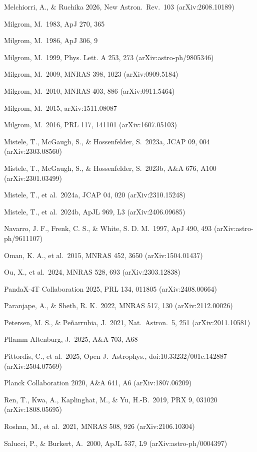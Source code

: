\documentclass[
  10pt,
]{article}
\begin{document}
{\begin{list}{}{\setlength{\leftmargin}{1.5em}\setlength{\itemindent}{-1.5em}\setlength{\itemsep}{1pt}\setlength{\parsep}{0pt}}
\item Melchiorri, A., \& Ruchika 2026, New Astron.\ Rev.\ 103 (arXiv:2608.10189)
\item Milgrom, M.\ 1983, ApJ 270, 365
\item Milgrom, M.\ 1986, ApJ 306, 9
\item Milgrom, M.\ 1999, Phys. Lett. A 253, 273 (arXiv:astro-ph/9805346)
\item Milgrom, M.\ 2009, MNRAS 398, 1023 (arXiv:0909.5184)
\item Milgrom, M.\ 2010, MNRAS 403, 886 (arXiv:0911.5464)
\item Milgrom, M.\ 2015, arXiv:1511.08087
\item Milgrom, M.\ 2016, PRL 117, 141101 (arXiv:1607.05103)
\item Mistele, T., McGaugh, S., \& Hossenfelder, S.\ 2023a, JCAP 09, 004 (arXiv:2303.08560)
\item Mistele, T., McGaugh, S., \& Hossenfelder, S.\ 2023b, A\&A 676, A100 (arXiv:2301.03499)
\item Mistele, T., et al.\ 2024a, JCAP 04, 020 (arXiv:2310.15248)
\item Mistele, T., et al.\ 2024b, ApJL 969, L3 (arXiv:2406.09685)
\item Navarro, J. F., Frenk, C. S., \& White, S. D. M.\ 1997, ApJ 490, 493 (arXiv:astro-ph/9611107)
\item Oman, K. A., et al.\ 2015, MNRAS 452, 3650 (arXiv:1504.01437)
\item Ou, X., et al.\ 2024, MNRAS 528, 693 (arXiv:2303.12838)
\item PandaX-4T Collaboration 2025, PRL 134, 011805 (arXiv:2408.00664)
\item Paranjape, A., \& Sheth, R. K.\ 2022, MNRAS 517, 130 (arXiv:2112.00026)
\item Petersen, M. S., \& Pe\~narrubia, J.\ 2021, Nat.\ Astron.\ 5, 251 (arXiv:2011.10581)
\item Pflamm-Altenburg, J.\ 2025, A\&A 703, A68
\item Pittordis, C., et al.\ 2025, Open J.\ Astrophys., doi:10.33232/001c.142887 (arXiv:2504.07569)
\item Planck Collaboration 2020, A\&A 641, A6 (arXiv:1807.06209)
\item Ren, T., Kwa, A., Kaplinghat, M., \& Yu, H.-B.\ 2019, PRX 9, 031020 (arXiv:1808.05695)
\item Roshan, M., et al.\ 2021, MNRAS 508, 926 (arXiv:2106.10304)
\item Salucci, P., \& Burkert, A.\ 2000, ApJL 537, L9 (arXiv:astro-ph/0004397)

\end{list}}
\end{document}

